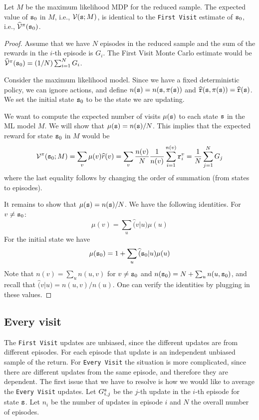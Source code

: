 \begin{advanced}
\begin{theorem}
\label{thm:MC-ML}
%
Let $M$ be the maximum likelihood MDP for the reduced sample. The
expected value of ${\tt s}_0$ in $M$, i.e., $\mathcal{V}({\tt s};M)$, is
identical to the {\tt First Visit} estimate of ${\tt s}_0$, i.e.,
$\widehat{\mathcal{V}}^\pi({\tt s}_0)$.
\end{theorem}

\begin{proof}
Assume that we have $N$ episodes in the reduced sample and the sum
of the rewards in the $i$-th episode is $G_i$. The First Visit Monte
Carlo estimate would be
$\widehat{\mathcal{V}}^\pi({\tt s}_0)=(1/N)\sum_{i=1}^N G_i$.

Consider the maximum likelihood model. Since we have a fixed
deterministic policy, we can ignore actions, and define
$n({\tt s})=n({\tt s},\pi({\tt s}))$ and
$\widehat{{\tt r}}({\tt s},\pi({\tt s}))=\widehat{{\tt r}}({\tt s})$.
We set the initial state ${\tt s}_0$ to be the state we are updating.

We want to compute the expected number of visits $\mu({\tt s})$ to
each state ${\tt s}$ in the ML model $M$. We will show that
$\mu({\tt s})=n({\tt s})/N$. This implies that the expected reward for
state ${\tt s}_0$ in $M$ would be
\[
\mathcal{V}^\pi({\tt s}_0;M)=\sum_v \mu(v) \widehat{r}(v)=\sum_v
\frac{n(v)}{N}\frac{1}{n(v)}\sum_{i=1}^{n(v)} {\tt r}_i^v =
\frac{1}{N}\sum_{j=1}^N G_j
\]
where the last equality follows by changing the order of summation
(from states to episodes).

It remains to show that $\mu({\tt s})=n({\tt s})/N$. We have the
following identities. For $v\neq {\tt s}_0$:
\[
\mu(v)=\sum_u \widehat(v|u)\mu(u)
\]
For the initial state we have
\[
\mu({\tt s}_0)=1+ \sum_u \widehat({\tt s}_0|u)\mu(u)
\]
Note that $n(v)=\sum_u n(u,v)$ for $v\neq {\tt s}_0$ and
$n({\tt s}_0)=N+\sum_u n(u,{\tt s}_0)$, and recall that
$\widehat(v|u)=n(u,v)/n(u)$. One can verify the identities by
plugging in these values.
\end{proof}

\subsection{Every visit}

The {\tt First Visit} updates are unbiased, since the different
updates are from different episodes. For each episode that update is
an independent unbiased sample of the return.
%
For {\tt Every Visit} the situation is more complicated, since there
are different updates from the same episode, and therefore they are
dependent. The first issue that we have to resolve is how we would like
to average the {\tt Every Visit} updates. Let $G^{\tt s}_{i,j}$
be the $j$-th update in the $i$-th episode for state ${\tt s}$. Let
$n_i$ be the number of updates in episode $i$ and $N$ the overall
number of episodes.


\end{advanced}
